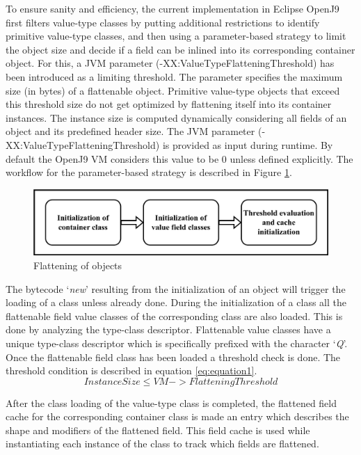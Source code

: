 \documentclass[12 pt, a4paper]{article}
\begin{document}
To ensure sanity and efficiency, the current implementation in Eclipse OpenJ9 \citep{OpenJ9} first filters value-type classes
by 
putting additional restrictions to identify primitive value-type classes, and then using a parameter-based strategy to 
limit the object size and decide if a field can be inlined into its corresponding container object. 
For this, a JVM parameter (-XX:ValueTypeFlatteningThreshold) has been introduced as a limiting
threshold. 
The parameter  specifies the maximum size (in bytes) of a 
flattenable object. 
Primitive value-type objects \citep{JEPP} that exceed this threshold size do not get 
optimized by flattening itself into its container instances. 
The instance size is computed dynamically considering all fields of an object 
and its predefined header size. The JVM parameter (-XX:ValueTypeFlatteningThreshold) is provided as input during runtime. 
By default the OpenJ9 VM 
considers this value to be {0} unless defined explicitly.
The workflow for the parameter-based strategy is described in Figure \ref{fig:Figure 2}.

\begin{figure}[h]
	\vskip 0.2cm
	\centering
	\includegraphics[scale=0.27]{Images/Class_Init.jpg}
	\caption{Flattening of objects}
	\label{fig:Figure 2}
\end{figure}



The bytecode `\textit{new}' resulting from the initialization of an object will trigger the loading 
of a class unless already done. 
During the initialization of a class all the flattenable field value classes of the 
corresponding class are also loaded. This is done by analyzing the type-class descriptor.
Flattenable value classes have a unique type-class descriptor which is specifically prefixed 
with the character `\textit{Q}'. 
Once the flattenable field class has been loaded a threshold check is done. The threshold 
condition is described in equation \ref{eq:equation1}.
\begin{equation}
	\label{eq:equation1}
	Instance Size \leq VM->Flattening Threshold
\end{equation} 

After the class loading of the value-type class is completed, the flattened field
cache for the corresponding container class is made an entry which describes the shape and modifiers 
of the flattened field. This field cache is used while instantiating
each instance of the class to track which fields are flattened. 
\clearpage
\end{document}
